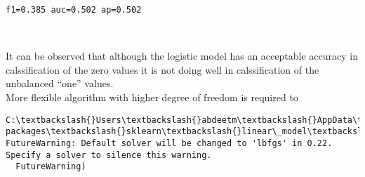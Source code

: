 \documentclass[11pt]{article}
\begin{document}
    \begin{Verbatim}[commandchars=\\\{\}]
f1=0.385 auc=0.502 ap=0.502

    \end{Verbatim}

    \begin{center}
    \end{center}
    { \hspace*{\fill} \\}
    
    It can be observed that although the logistic model has an acceptable
accuracy in calssification of the zero values it is not doing well in
calssification of the unbalanced ``one'' values.\\
More flexible algorithm with higher degree of freedom is required to

    \begin{Verbatim}[commandchars=\\\{\}]
C:\textbackslash{}Users\textbackslash{}abdeetm\textbackslash{}AppData\textbackslash{}Local\textbackslash{}Continuum\textbackslash{}anaconda3\textbackslash{}lib\textbackslash{}site-packages\textbackslash{}sklearn\textbackslash{}linear\_model\textbackslash{}logistic.py:433: FutureWarning: Default solver will be changed to 'lbfgs' in 0.22. Specify a solver to silence this warning.
  FutureWarning)

    \end{Verbatim}

    \begin{center}
    \end{center}
    { \hspace*{\fill} \\}
    
\end{document}

